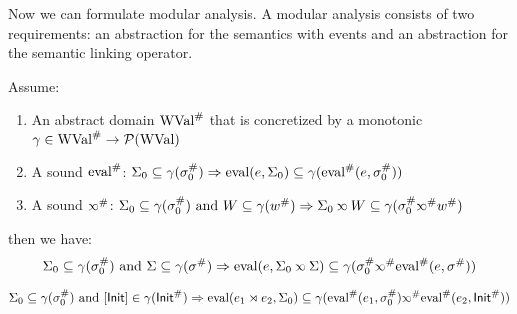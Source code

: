 Now we can formulate modular analysis.
A modular analysis consists of two requirements: an abstraction for the semantics with events and an abstraction for the semantic linking operator.
\begin{thm}
  Assume:
  \begin{enumerate}
    \item An abstract domain ${\text{WVal}}^{\#}$ that is concretized by a monotonic $\gamma\in{\text{WVal}}^{\#}\rightarrow\mathcal{P}(\text{WVal})$
    \item A sound ${\text{eval}}^{\#}$: $\Sigma_0\subseteq\gamma({\sigma}^{\#}_0)\Rightarrow\text{eval}(e,\Sigma_0)\subseteq\gamma({\text{eval}}^{\#}(e,{\sigma}^{\#}_0))$
    \item A sound $\Abs\semlink$: $\Sigma_0\subseteq\gamma(\Abs\ctx_0)\text{ and }W\subseteq\gamma(\Abs{w})\Rightarrow\Sigma_0\semlink W\subseteq\gamma(\Abs\ctx_0\Abs\semlink\Abs{w})$
  \end{enumerate}
  then we have:
  \[\Sigma_0\subseteq\gamma(\Abs\ctx_0)\text{ and }\Sigma\subseteq\gamma(\Abs\ctx)\Rightarrow\eval(e,\Sigma_0\semlink\Sigma)\subseteq\gamma(\Abs\ctx_0\Abs\semlink\Abs\eval(e,\Abs\ctx))\]
\end{thm}
\begin{cor}
  \[\Sigma_0\subseteq\gamma(\Abs\ctx_0)\text{ and }[\InitE]\in\gamma(\Abs\InitE)\Rightarrow\eval(e_1\synlink e_2,\Sigma_0)\subseteq\gamma(\Abs\eval(e_1,\Abs\ctx_0)\Abs\semlink\Abs\eval(e_2,\Abs\InitE))\]
\end{cor}
